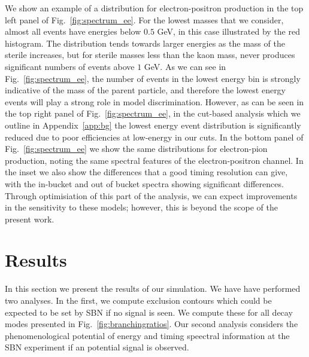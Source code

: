 \documentclass[11pt, a4paper]{article}
\newcommand{\reffig}[1]{Fig.~\ref{#1}}
\newcommand{\refapp}[1]{Appendix~\ref{#1}}
\begin{document}
We show an example of a distribution for electron-positron production in the
top left panel of \reffig{fig:spectrum_ee}. For the lowest masses that we consider,
almost all events have energies below $0.5$ GeV, in this case illustrated by
the red histogram. The distribution tends towards larger energies as the mass
of the sterile increases, but for sterile masses less than the kaon mass, never
produces significant numbers of events above $1$ GeV. As we can see in
\reffig{fig:spectrum_ee}, the number of events in the lowest energy bin is
strongly indicative of the mass of the parent particle, and therefore the
lowest energy events will play a strong role in model discrimination. However,
as can be seen in the top right panel of \reffig{fig:spectrum_ee}, in the cut-based
analysis which we outline in \refapp{app:bg} the lowest energy event
distribution is significantly reduced due to poor efficiencies at low-energy in
our cuts. In the bottom panel of \reffig{fig:spectrum_ee} we show the same distributions for electron-pion production, noting the same spectral features of the electron-positron channel. In the inset we also show the differences that a good timing resolution can give, with the in-bucket and out of bucket spectra showing significant differences.  Through optimisiation of this part of the analysis, we can expect
improvements in the sensitivity to these models; however, this is beyond the
scope of the present work.  



%
%
%

\section{\label{sec:sensitivities}Results}

In this section we present the results of our simulation. We have have
performed two analyses. In the first, we compute exclusion contours which could
be expected to be set by SBN if no signal is seen. We compute these for all
decay modes presented in \reffig{fig:branchingratios}. Our second analysis
considers the phenomenological potential of energy and timing speectral information at the SBN
experiment if an potential signal is observed. 
\end{document}
